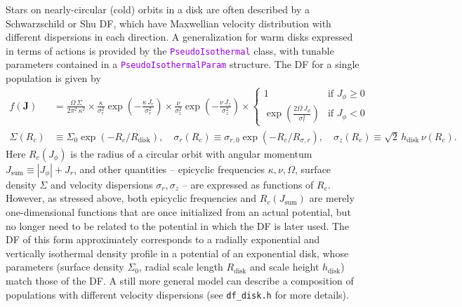 \documentclass[12pt]{article}
\newcommand{\ttt}[1]{\textcolor{darkviolet}{\texttt{#1}}}
\newcommand{\bJ}{\boldsymbol{J}}
\begin{document}
Stars on nearly-circular (cold) orbits in a disk are often described by a Schwarzschild or Shu DF, which have Maxwellian velocity distribution with different dispersions in each direction. A generalization for warm disks \cite{Dehnen1999} expressed in terms of actions \cite{BinneyMcMillan2011} is provided by the \ttt{PseudoIsothermal} class, with tunable parameters contained in a \ttt{PseudoIsothermalParam} structure. The DF for a single population is given by
\begin{align*}
f(\bJ) &= \frac{\Omega\,\Sigma}{2\pi^2\,\kappa^2} \times
\frac{\kappa}{\sigma_r^2} \exp\left(-\frac{\kappa\,J_r}{\sigma_r^2}\right) \times
\frac{\nu}   {\sigma_z^2} \exp\left(-\frac{\nu\,   J_z}{\sigma_z^2}\right) \times
\left\{ \begin{array}{ll}  1 & \mbox{if }J_\phi\ge 0 \\
\exp\left( \frac{2\Omega\,J_\phi}{\sigma_r^2} \right) & \mbox{if }J_\phi<0 \end{array} \right. \\
\Sigma(R_c)  &\equiv \Sigma_0 \exp( -R_c / R_\mathrm{disk} ) , \quad
\sigma_r(R_c) \equiv \sigma_{r,0} \exp( -R_c / R_{\sigma,r} ) , \quad
\sigma_z(R_c) \equiv \sqrt{2}\,h_\mathrm{disk}\,\nu(R_c).
\end{align*}
Here $R_c(J_\phi)$ is the radius of a circular orbit with angular momentum $J_\mathrm{sum}\equiv |J_\phi| + J_r$, and other quantities -- epicyclic frequencies $\kappa,\nu,\Omega$, surface density $\Sigma$ and velocity dispersions $\sigma_r,\sigma_z$ -- are expressed as functions of $R_c$. However, as stressed above, both epicyclic frequencies and $R_c(J_\mathrm{sum})$ are merely one-dimensional functions that are once initialized from an actual potential, but no longer need to be related to the potential in which the DF is later used. The DF of this form approximately corresponds to a radially exponential and vertically isothermal density profile in a potential of an exponential disk, whose parameters (surface density $\Sigma_0$, radial scale length $R_\mathrm{disk}$ and scale height $h_\mathrm{disk}$) match those of the DF.
A still more general model can describe a composition of populations with different velocity dispersions (see \texttt{df_disk.h} for more details).

%
\end{document}
